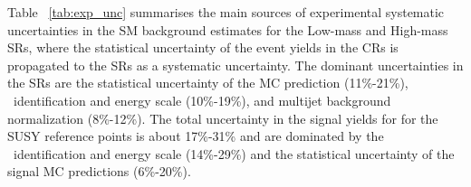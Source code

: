 \begin{description}
	\begin{table}[!hbt]
	\centering
	\caption{The postfit relative systematic uncertainty (\%) in the  background estimate (signal reference points) in the Low-mass and High-mass \acp{SR} from the leading sources at top (bottom). Uncertainties from different sources in the background estimates may be correlated, and do not necessarily add in quadrature to the total uncertainty. }
	\resizebox{0.7\textwidth}{!}{
		}
	\resizebox{0.7\textwidth}{!}{
		}
	\label{tab:exp_unc}
	\end{table}
	Table ~\ref{tab:exp_unc} summarises the main sources of experimental systematic uncertainties in the \ac{SM} background estimates for the Low-mass and High-mass \acp{SR}, where 
	the statistical uncertainty of the event yields in the \acp{CR} is propagated to the \acp{SR} as a systematic uncertainty.
	The dominant uncertainties in the \acp{SR} are the statistical uncertainty of the \ac{MC} prediction (11\%-21\%), \ltau\ identification and energy scale (10\%-19\%), and multijet background normalization (8\%-12\%).
	The total uncertainty in the signal yields for for the \ac{SUSY} reference points is about 17\%-31\% and are dominated by the \ltau\ identification and energy scale (14\%-29\%) and the statistical uncertainty of the signal \ac{MC} predictions (6\%-20\%).
	
	
	
	\end{description}
